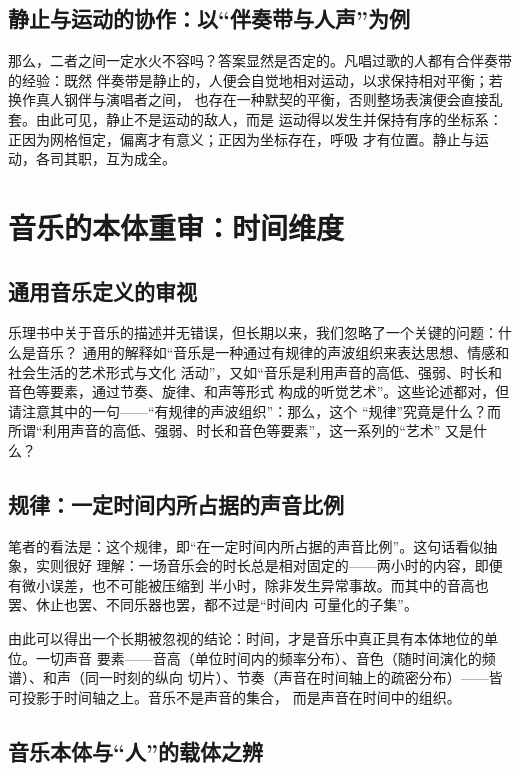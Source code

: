 \documentclass[11pt,a4paper,fontset=none]{ctexart}
\begin{document}
\subsection{静止与运动的协作：以“伴奏带与人声”为例}

那么，二者之间一定水火不容吗？答案显然是否定的。凡唱过歌的人都有合伴奏带的经验：既然
伴奏带是静止的，人便会自觉地相对运动，以求保持相对平衡；若换作真人钢伴与演唱者之间，
也存在一种默契的平衡，否则整场表演便会直接乱套。由此可见，静止不是运动的敌人，而是
运动得以发生并保持有序的坐标系：正因为网格恒定，偏离才有意义；正因为坐标存在，呼吸
才有位置。静止与运动，各司其职，互为成全。

\section{音乐的本体重审：时间维度}

\subsection{通用音乐定义的审视}

乐理书中关于音乐的描述并无错误，但长期以来，我们忽略了一个关键的问题：什么是音乐？
通用的解释如“音乐是一种通过有规律的声波组织来表达思想、情感和社会生活的艺术形式与文化
活动”，又如“音乐是利用声音的高低、强弱、时长和音色等要素，通过节奏、旋律、和声等形式
构成的听觉艺术”。这些论述都对，但请注意其中的一句——“有规律的声波组织”：那么，这个
“规律”究竟是什么？而所谓“利用声音的高低、强弱、时长和音色等要素”，这一系列的“艺术”
又是什么？

\subsection{规律：一定时间内所占据的声音比例}

笔者的看法是：这个规律，即“在一定时间内所占据的声音比例”。这句话看似抽象，实则很好
理解：一场音乐会的时长总是相对固定的——两小时的内容，即便有微小误差，也不可能被压缩到
半小时，除非发生异常事故。而其中的音高也罢、休止也罢、不同乐器也罢，都不过是“时间内
可量化的子集”。

由此可以得出一个长期被忽视的结论：时间，才是音乐中真正具有本体地位的单位。一切声音
要素——音高（单位时间内的频率分布）、音色（随时间演化的频谱）、和声（同一时刻的纵向
切片）、节奏（声音在时间轴上的疏密分布）——皆可投影于时间轴之上。音乐不是声音的集合，
而是声音在时间中的组织。

\subsection{音乐本体与“人”的载体之辨}
\end{document}
